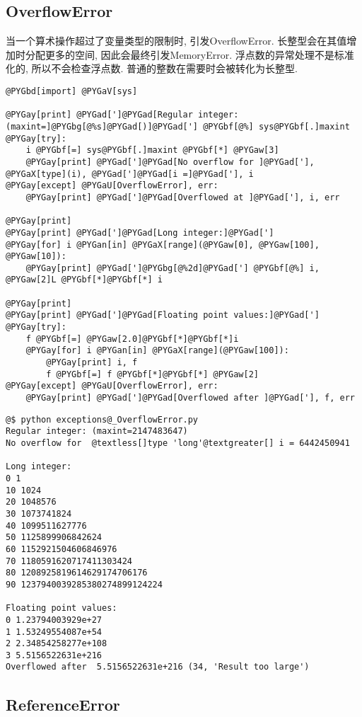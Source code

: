 \documentclass[a4paper,10pt,english]{manual}
\begin{document}
\subsection{OverflowError}

当一个算术操作超过了变量类型的限制时, 引发OverflowError. 长整型会在其值增加时分配更多的空间, 因此会最终引发MemoryError. 浮点数的异常处理不是标准化的, 所以不会检查浮点数. 普通的整数在需要时会被转化为长整型.

\begin{Verbatim}[commandchars=@\[\]]
@PYGbd[import] @PYGaV[sys]

@PYGay[print] @PYGad[']@PYGad[Regular integer: (maxint=]@PYGbg[@%s]@PYGad[)]@PYGad['] @PYGbf[@%] sys@PYGbf[.]maxint
@PYGay[try]:
    i @PYGbf[=] sys@PYGbf[.]maxint @PYGbf[*] @PYGaw[3]
    @PYGay[print] @PYGad[']@PYGad[No overflow for ]@PYGad['], @PYGaX[type](i), @PYGad[']@PYGad[i =]@PYGad['], i
@PYGay[except] @PYGaU[OverflowError], err:
    @PYGay[print] @PYGad[']@PYGad[Overflowed at ]@PYGad['], i, err

@PYGay[print]
@PYGay[print] @PYGad[']@PYGad[Long integer:]@PYGad[']
@PYGay[for] i @PYGan[in] @PYGaX[range](@PYGaw[0], @PYGaw[100], @PYGaw[10]):
    @PYGay[print] @PYGad[']@PYGbg[@%2d]@PYGad['] @PYGbf[@%] i, @PYGaw[2]L @PYGbf[*]@PYGbf[*] i

@PYGay[print]
@PYGay[print] @PYGad[']@PYGad[Floating point values:]@PYGad[']
@PYGay[try]:
    f @PYGbf[=] @PYGaw[2.0]@PYGbf[*]@PYGbf[*]i
    @PYGay[for] i @PYGan[in] @PYGaX[range](@PYGaw[100]):
        @PYGay[print] i, f
        f @PYGbf[=] f @PYGbf[*]@PYGbf[*] @PYGaw[2]
@PYGay[except] @PYGaU[OverflowError], err:
    @PYGay[print] @PYGad[']@PYGad[Overflowed after ]@PYGad['], f, err
\end{Verbatim}

\begin{Verbatim}[commandchars=@\[\]]
@$ python exceptions@_OverflowError.py
Regular integer: (maxint=2147483647)
No overflow for  @textless[]type 'long'@textgreater[] i = 6442450941

Long integer:
0 1
10 1024
20 1048576
30 1073741824
40 1099511627776
50 1125899906842624
60 1152921504606846976
70 1180591620717411303424
80 1208925819614629174706176
90 1237940039285380274899124224

Floating point values:
0 1.23794003929e+27
1 1.53249554087e+54
2 2.34854258277e+108
3 5.5156522631e+216
Overflowed after  5.5156522631e+216 (34, 'Result too large')
\end{Verbatim}


\subsection{ReferenceError}
\end{document}
